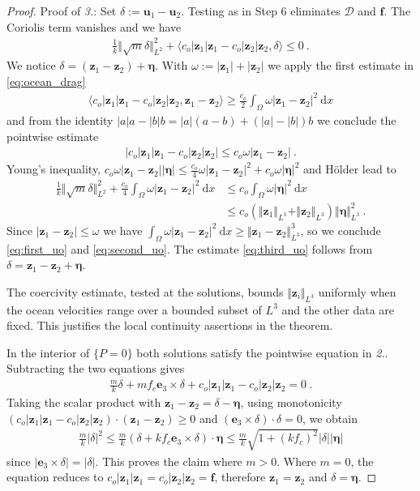 \documentclass{article}
\theoremstyle{definition}
\newcommand{\bfu}{\boldsymbol{u}}
\newcommand{\bfe}{\boldsymbol{e}}
\newcommand{\bff}{\boldsymbol{f}}
\newcommand{\D}{\mathcal{D}}
\newcommand{\dd}{\:\mathrm{d}}
\newcommand{\bfeta}{\boldsymbol{\eta}}
\newcommand{\bfz}{\boldsymbol{z}}
\begin{document}
\begin{proof}
    Proof of \textit{3.}: Set $\delta:=\bfu_1-\bfu_2$. Testing as in Step 6 eliminates
    $\D$ and $\bff$. The Coriolis term vanishes and we have
    \begin{align*}
        \frac{1}{k}\Vert\sqrt{m}\delta\Vert^2_{L^2} +
         \langle c_o|\bfz_1|\bfz_1-c_o|\bfz_2|\bfz_2,\delta\rangle\leq 0 \ .
    \end{align*}
    We notice $\delta = (\bfz_1-\bfz_2)+\bfeta$. With $\omega := |\bfz_1|+|\bfz_2|$ we apply the first estimate in \eqref{eq:ocean_drag}
    \begin{align*}
        \langle c_o|\bfz_1|\bfz_1-c_o|\bfz_2|\bfz_2,\bfz_1-\bfz_2\rangle \geq \frac{c_o}{2}\int_\Omega \omega |\bfz_1-\bfz_2|^2\dd x
    \end{align*}
    and from the identity $|a|a-|b|b = |a|(a-b)+(|a|-|b|)b$ we conclude the pointwise estimate
    \begin{align*}
        \left|c_o|\bfz_1|\bfz_1-c_o|\bfz_2|\bfz_2\right|\leq c_o \omega |\bfz_1-\bfz_2| \ .
    \end{align*}
    Young's inequality, $c_o \omega |\bfz_1-\bfz_2||\bfeta|\leq \frac{c_o}{4}\omega |\bfz_1-\bfz_2|^2+c_o\omega|\bfeta|^2$ and H\"older lead to
    \begin{align*}
        \frac{1}{k}\Vert\sqrt{m}\delta\Vert^2_{L^2} + \frac{c_o}{4} \int_\Omega\omega |\bfz_1-\bfz_2|^2\dd x
        &\leq c_o \int_\Omega \omega|\bfeta|^2 \dd x\\
        &\leq c_o(\Vert\bfz_1\Vert_{L^3}+\Vert\bfz_2\Vert_{L^3})\Vert\bfeta\Vert^2_{L^3} \ .
    \end{align*}
    Since $|\bfz_1-\bfz_2|\leq \omega$ we have $\int_\Omega\omega|\bfz_1-\bfz_2|^2\dd x \geq \Vert\bfz_1-\bfz_2\Vert^3_{L^3}$, so we conclude \eqref{eq:first_uo} and \eqref{eq:second_uo}. The estimate \eqref{eq:third_uo} follows from $\delta = \bfz_1-\bfz_2 + \bfeta$.

    The coercivity estimate, tested at the solutions, bounds
    $\Vert\bfz_i\Vert_{L^3}$ uniformly when the ocean velocities range over
    a bounded subset of $L^3$ and the other data are fixed. This justifies
    the local continuity assertions in the theorem.

    In the interior of $\{P=0\}$ both solutions satisfy the pointwise equation in \textit{2.}. Subtracting the two equations gives
    \begin{align*}
        \frac{m}{k}\delta +mf_c\bfe_3\times \delta + c_o|\bfz_1|\bfz_1-c_o|\bfz_2|\bfz_2 =0 \ .
    \end{align*}
    Taking the scalar product with $\bfz_1-\bfz_2=\delta-\bfeta$, using monotonicity $(c_o|\bfz_1|\bfz_1-c_o|\bfz_2|\bfz_2)\cdot(\bfz_1-\bfz_2)\geq 0$ and $(\bfe_3\times\delta)\cdot\delta=0$, we obtain
    \begin{align*}
        \frac{m}{k}|\delta|^2 \leq \frac{m}{k}(\delta+kf_c\bfe_3\times\delta)\cdot\bfeta
        \leq \frac{m}{k}\sqrt{1+(kf_c)^2}|\delta||\bfeta|
    \end{align*}
    since $|\bfe_3\times\delta|=|\delta|$. This proves the claim where $m>0$. Where $m=0$,
    the equation reduces to $c_o|\bfz_1|\bfz_1=c_o|\bfz_2|\bfz_2=\bff$, therefore $\bfz_1=\bfz_2$ and $\delta = \bfeta$.
\end{proof}
\end{document}
